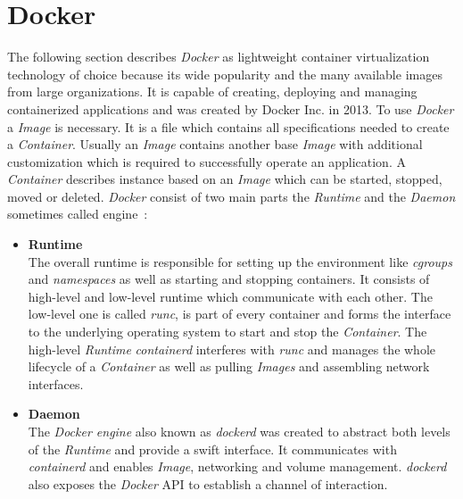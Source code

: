 \section{Docker}
The following section describes \textit{Docker} as lightweight container virtualization technology of choice because its wide popularity and the many available images from large organizations.
It is capable of creating, deploying and managing containerized applications and was created by Docker Inc. in 2013.
To use \textit{Docker} a \textit{Image} is necessary.
It is a file which contains all specifications needed to create a \textit{Container}.
Usually an \textit{Image} contains another base \textit{Image} with additional customization which is required to successfully operate an application.
A \textit{Container} describes instance based on an \textit{Image} which can be started, stopped, moved or deleted.
\textit{Docker} consist of two main parts the \textit{Runtime} and the \textit{Daemon} sometimes called engine~\cite{docker2}:
\begin{itemize}
    \item[]{\textbf{Runtime}\\
    The overall runtime is responsible for setting up the environment like \textit{cgroups} and \textit{namespaces} as well as starting and stopping containers.
    It consists of high-level and low-level runtime which communicate with each other.
    The low-level one is called \textit{runc}, is part of every container and forms the interface to the underlying operating system to start and stop the \textit{Container}.
    The high-level \textit{Runtime} \textit{containerd} interferes with \textit{runc} and manages the whole lifecycle of a \textit{Container} as well as pulling \textit{Images} and assembling network interfaces.
    }
    \item[]{\textbf{Daemon}\\
    The \textit{Docker engine} also known as \textit{dockerd} was created to abstract both levels of the \textit{Runtime} and provide a swift interface.
    It communicates with \textit{containerd} and enables \textit{Image}, networking and volume management.
    \textit{dockerd} also exposes the \textit{Docker} API to establish a channel of interaction.
    }
\end{itemize}


